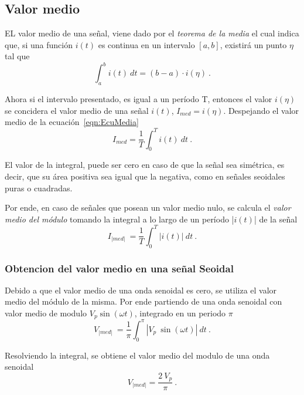 \subsection{Valor medio}
    EL valor medio de una señal, viene dado por el 
    \textit{teorema de la media} el cual indica que, si una función \(i(t)\)
    es continua en un intervalo \([a,b]\), existirá un punto \(\eta\) 
    tal que
    \begin{equation}
        \int_{a}^{b} i(t)~dt = (b-a)\cdot i(\eta)~. \label{eqn:EcuMedia}
    \end{equation}

    \noindent Ahora si el intervalo presentado, es igual a un período T, entonces 
    el valor \(i(\eta)\) se concidera el valor medio de una señal \(i(t)\), 
    \(I_{med} = i(\eta)\). Despejando el valor medio de la ecuación~\ref{eqn:EcuMedia}
    \begin{equation*}
        I_{med}= \dfrac{1}{T}\int_{0}^{T} i(t)~dt~.
    \end{equation*}

    El valor de la integral, puede ser cero en caso de que la señal sea simétrica, es decir,
    que su área positiva sea igual que la negativa, como en señales seoidales puras o 
    cuadradas.
    
    \noindent Por ende, en caso de señales que posean un valor medio nulo, se calcula el
    \textit{valor medio del módulo} tomando la integral a lo largo de un período 
    |\(i(t)\)| de la señal
    \begin{equation*}
        I_{|med|} ~ = \dfrac{1}{T} \int_{0}^{T} |i(t)|~dt~.
    \end{equation*}

        \subsubsection{Obtencion del valor medio en una señal Seoidal}

            Debido a que el valor medio de una onda senoidal es cero, se utiliza el 
            valor medio del módulo de la misma. Por ende partiendo de una onda senoidal
            con valor medio de modulo \(V_p\sin(\omega t)\), integrado en un periodo \(\pi\)
            \begin{equation*}
                V_{|med|} ~ = \dfrac{1}{\pi} \int_{0}^{\pi} |V_p~\sin(\omega t)|~dt~.
            \end{equation*}

            \noindent Resolviendo la integral, se obtiene el valor medio del modulo de una 
            onda senoidal 
            \begin{equation*}
                V_{|med|} = \dfrac{2~V_p}{\pi}~.
            \end{equation*}
            
